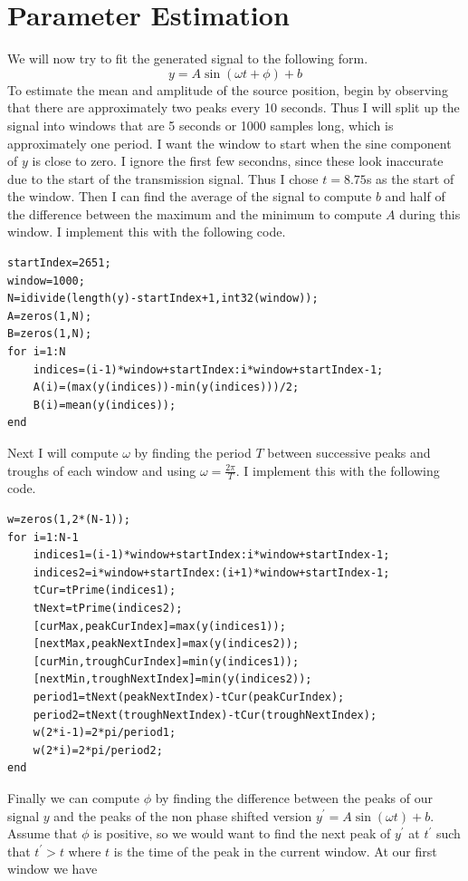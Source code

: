 \documentclass[12pt]{article}
\begin{document}
\section{Parameter Estimation}

We will now try to fit the generated signal to the following form.
\[y=A\sin(\omega t + \phi) + b\]
To estimate the mean and amplitude of the source position, begin by observing that there
are approximately two peaks every 10 seconds. Thus I will split up the signal into windows
that are 5 seconds or 1000 samples long, which is approximately one period. I want the window
to start when the sine component of \(y\) is close to zero. I ignore the first few secondns, since
these look inaccurate due to the start of the transmission signal. Thus I chose \(t=8.75\)s
as the start of the window. Then I can find the average of the signal to compute \(b\) and half
of the difference between the maximum and the minimum to compute \(A\) during this window.
I implement this with the following code.
\begin{verbatim}
startIndex=2651;
window=1000;
N=idivide(length(y)-startIndex+1,int32(window));
A=zeros(1,N);
B=zeros(1,N);
for i=1:N
    indices=(i-1)*window+startIndex:i*window+startIndex-1;
    A(i)=(max(y(indices))-min(y(indices)))/2;
    B(i)=mean(y(indices));
end
\end{verbatim}
Next I will compute \(\omega\) by finding the period \(T\) between successive peaks and troughs of each
window and using \(\omega=\frac{2\pi}{T}\). I implement this with the following code.
\begin{verbatim}
w=zeros(1,2*(N-1));
for i=1:N-1
    indices1=(i-1)*window+startIndex:i*window+startIndex-1;
    indices2=i*window+startIndex:(i+1)*window+startIndex-1;
    tCur=tPrime(indices1);
    tNext=tPrime(indices2);
    [curMax,peakCurIndex]=max(y(indices1));
    [nextMax,peakNextIndex]=max(y(indices2));
    [curMin,troughCurIndex]=min(y(indices1));
    [nextMin,troughNextIndex]=min(y(indices2));
    period1=tNext(peakNextIndex)-tCur(peakCurIndex);
    period2=tNext(troughNextIndex)-tCur(troughNextIndex);
    w(2*i-1)=2*pi/period1;
    w(2*i)=2*pi/period2;
end
\end{verbatim}
Finally we can compute \(\phi\) by finding the difference between the peaks of our signal \(y\) and
the peaks of the non phase shifted version \(y^\prime=A\sin(\omega t)+b\). Assume that \(\phi\) is
positive, so we would want to find the next peak of \(y^\prime\) at \(t^\prime\) such
that \(t^\prime>t\) where \(t\) is the time of the peak in the current window. At our first window we have
\end{document}
